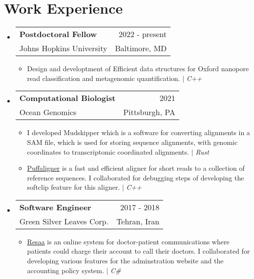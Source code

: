 \documentclass[A4,11pt]{article}
\makeatletter
\newcommand{\CVItem}[1]{
  \item\small{
    {#1 \vspace{-2pt}}
  }
}
\newcommand{\CVSubheading}[4]{
  \vspace{-2pt}\item
    \begin{tabular*}{0.97\textwidth}[t]{l@{\extracolsep{\fill}}r}
      \textbf{#1} & #2 \\
      \small#3 & \small #4 \\
    \end{tabular*}\vspace{-7pt}
}
\newcommand{\CVSubHeadingListStart}{\begin{itemize}[leftmargin=0.5cm, label={}]}
\newcommand{\CVSubHeadingListEnd}{\end{itemize}}
\newcommand{\CVItemListStart}{\begin{itemize}}
\newcommand{\CVItemListEnd}{\end{itemize}\vspace{-5pt}}
\makeatother
\begin{document}
\section{Work Experience}
  \CVSubHeadingListStart
    \CVSubheading{Postdoctoral Fellow}{2022 - present}
      {Johns Hopkins University}{Baltimore, MD}
      \CVItemListStart
        \CVItem{Design and developtment of Efficient data structures for Oxford nanopore read classification 
        and metagenomic quantification. $|$ \emph{\small{C++}}}
      \CVItemListEnd
    \CVSubheading
      {Computational Biologist}{2021} %
      {Ocean Genomics}{Pittsburgh, PA}
      \CVItemListStart
        \CVItem{I developed Mudskipper which is a software for converting alignments in a SAM file, which is used for storing
sequence alignments, with genomic coordinates to transcriptomic coordinated alignments. $|$ \emph{\small{Rust}}}
        \CVItem{\href{https://github.com/OceanGenomics/pufferfish/tree/soft-clip}{Puffaligner} is a fast and efficient aligner for short reads to a collection of reference sequences. I collaborated for
        debugging steps of developing the softclip feature for this aligner. $|$ \emph{\small{C++}}}
      \CVItemListEnd
    \CVSubheading
      {Software Engineer}{2017 - 2018} %
      {Green Silver Leaves Corp.}{Tehran, Iran}
      \CVItemListStart
        \CVItem{\href{https://resaa.net/}{Resaa} is an online system for doctor-patient communications where patients could charge their account to call
        their doctors. I collaborated for developing various features for the adminstration website and the accounting
        policy system. $|$ \emph{\small{C\#}}}
      \CVItemListEnd
  \CVSubHeadingListEnd

\begin{comment}
Ideally the title of the work should speak for what it is. However if you feel
like you should explain more about why the project is applicable to this job,
use item list as is shown in the work experience section.
\end{comment}
\end{document}

